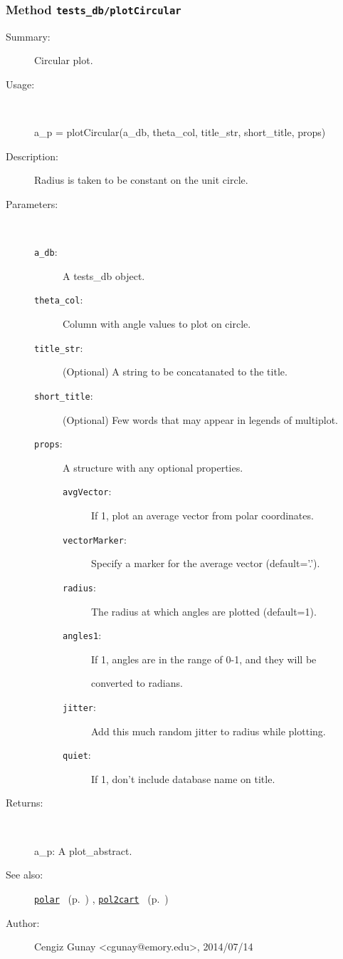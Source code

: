 \subsubsection[Method \texttt{plotCircular}]{Method \texttt{tests\_db/plotCircular}}%
%
\label{ref_tests_db__plotCircular}%
\hypertarget{ref_tests_db__plotCircular}{}%
\begin{description}
\item[Summary:]Circular plot.
%
\item[Usage:]~%
\begin{lyxcode}%
a\_p = plotCircular(a\_db, theta\_col, title\_str, short\_title, props)
%
\end{lyxcode}%
%
\item[Description:]%
Radius is taken to be constant on the unit circle.
\item[Parameters:]~
\begin{description}%
\item[\texttt{a\_db}:]
 A tests\_db object.
\item[\texttt{theta\_col}:]
 Column with angle values to plot on circle.
\item[\texttt{title\_str}:]
 (Optional) A string to be concatanated to the title.
\item[\texttt{short\_title}:]
 (Optional) Few words that may appear in legends of multiplot.
\item[\texttt{props}:]
 A structure with any optional properties.
\begin{description}%
\item[\texttt{avgVector}:]
 If 1, plot an average vector from polar coordinates.
\item[\texttt{vectorMarker}:]
 Specify a marker for the average vector (default='.').
\item[\texttt{radius}:]
 The radius at which angles are plotted (default=1).
\item[\texttt{angles1}:]
 If 1, angles are in the range of 0-1, and they will be

converted to radians.
\item[\texttt{jitter}:]
 Add this much random jitter to radius while plotting.
\item[\texttt{quiet}:]
 If 1, don't include database name on title.
\end{description}%
\end{description}%
%
\item[Returns:
]~

   a\_p: A plot\_abstract.
%
%
\item[See also:]%
\hyperlink{ref_polar}{\texttt{polar}}%
\ (p.~\pageref{ref_polar})%
%
, \hyperlink{ref_pol2cart}{\texttt{pol2cart}}%
\ (p.~\pageref{ref_pol2cart})%
%
%
\item[Author:]%
Cengiz Gunay <cgunay@emory.edu>, 2014/07/14
%
\end{description}
\methodline%
